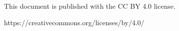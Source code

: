 \vfill
\sffamily
\color{black!80}\raggedright\fontsize{10pt}{10pt}\selectfont

This document is published with the CC BY 4.0 license.

https://creativecommons.org/licenses/by/4.0/
